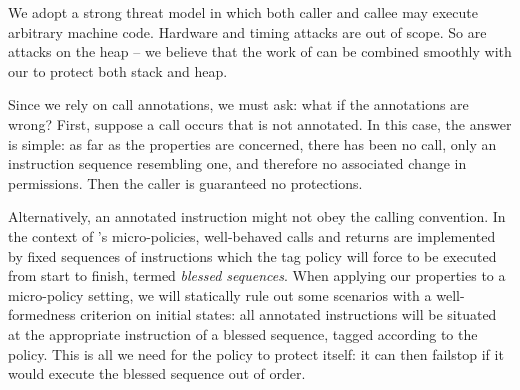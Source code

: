 \documentclass[acmsmall,review,anonymous]{acmart}\settopmatter{printfolios=true,printccs=false,printacmref=false}
\begin{document}
We adopt a strong threat model in which both caller and callee may execute
arbitrary machine code. Hardware and timing attacks are out of scope.
So are attacks on the heap -- we believe that the work of
\citet{DBLP:conf/post/AmorimHP18} can be combined smoothly with our
to protect both stack and heap.


Since we rely on call annotations, we must ask: what if the annotations
are wrong? First, suppose a call occurs that is not annotated.
In this case, the answer is simple: as far as the properties are concerned, there has
been no call, only an instruction sequence resembling one, and
therefore no associated change in permissions. Then the caller is guaranteed no
protections.

Alternatively, an annotated instruction might not obey the calling convention.
In the context of \citeauthor{DBLP:conf/sp/RoesslerD18}'s micro-policies, well-behaved calls
and returns are implemented by fixed sequences of instructions which the tag policy
will force to be executed from start to finish, termed {\em blessed sequences}.
When applying our properties to a micro-policy setting, we will statically rule out some
scenarios with a well-formedness criterion on initial states: all annotated instructions will
be situated at the appropriate instruction of a blessed sequence, tagged according to the policy.
This is all we need for the policy to protect itself: it can then failstop if it would
execute the blessed sequence out of order.

\end{document}

